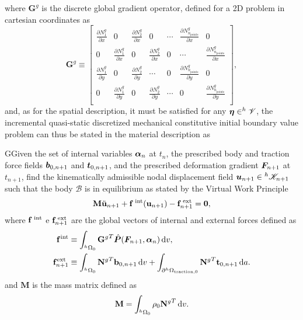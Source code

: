 where $\mathbf G^g$ is the discrete global gradient operator, defined for a 2D problem in cartesian coordinates as
\begin{equation}
    \mathbf G^g\equiv \left[
    \begin{array}{ccccccc}
         \displaystyle{\frac{\partial N_1^g}{\partial x}} & 0 & \displaystyle{\frac{\partial N_2^g}{\partial x}} & 0 & \cdots &
         \displaystyle{\frac{\partial N_{n_\text{points}}^g}{\partial x}} & 0\\
         0 & \displaystyle{\frac{\partial N_1^g}{\partial x}} & 0 & \displaystyle{\frac{\partial N_2^g}{\partial x}} & 0 & \cdots &
         \displaystyle{\frac{\partial N_{n_\text{points}}^g}{\partial x}}\\
         \displaystyle{\frac{\partial N_1^g}{\partial y}} & 0 & \displaystyle{\frac{\partial N_2^g}{\partial y}} & \cdots &
         0 & \displaystyle{\frac{\partial N_{n_\text{points}}^g}{\partial y}} & 0\\
         0 & \displaystyle{\frac{\partial N_1^g}{\partial y}} & 0 & \displaystyle{\frac{\partial N_2^g}{\partial y}} & \cdots &
         0 & \displaystyle{\frac{\partial N_{n_\text{points}}^g}{\partial y}}\\
    \end{array}
    \right],
\end{equation}
and, as for the spatial description, it must  be satisfied for any $\bm{\eta} \in ^h \mathscr{V}$, the incremental quasi-static discretized mechanical constitutive initial boundary value problem can thus be stated in the material description as
\begin{problem}
GGiven the set of internal variables $\bm{\alpha}_n$ at $t_n$, the prescribed body and traction force fields $\bm{b}_{0,n+1}$ and $\bm{t}_{0,n+1}$, and the prescribed deformation gradient $\bm{F}_{n+1}$ at $t_{n+1}$, find the kinematically admissible nodal displacement field $\bm{u}_{n+1}\in {^h\mathscr{K}_{n+1}}$ such that the body $\mathscr{B}$ is in equilibrium as stated by the Virtual Work Principle
\begin{equation}
    \mathbf M \ddot{\mathbf u}_{n+1} +\mathbf f^\text{\;int}(\mathbf u_{n+1})-\mathbf f^\text{\;ext}_{n+1}=\mathbf 0, \label{eq:equilibrium_material}
\end{equation}
where $\mathbf f^\text{\;int}$ e $\mathbf f^\text{\;ext}_{n+1}$ are the global vectors of internal and external forces defined as
\begin{align}
    \mathbf f^\text{int} &\equiv \int_{^h\Omega_0}{\mathbf G^g}^T \hat{\bm{P}}(\bm{F}_{n+1}, \bm{\alpha}_n)\,\mathrm{d} v,\\
    \mathbf f^\text{ext}_{n+1} &\equiv \int_{^h\Omega_0}{\mathbf N^g}^T \mathbf b_{0,n+1}\,\mathrm{d} v + \int_{\partial^h\Omega_\text{traction,0}}{\mathbf N^g}^T \mathbf t_{0,n+1}\,\mathrm{d} a.
\end{align}
and $\mathbf M$ is the mass matrix defined as
\begin{equation}
  \mathbf M = \int_{{}^h\Omega_0} \rho_0 {\mathbf{N}^g}^T \,\mathrm{d} v.
\end{equation}
\end{problem}

